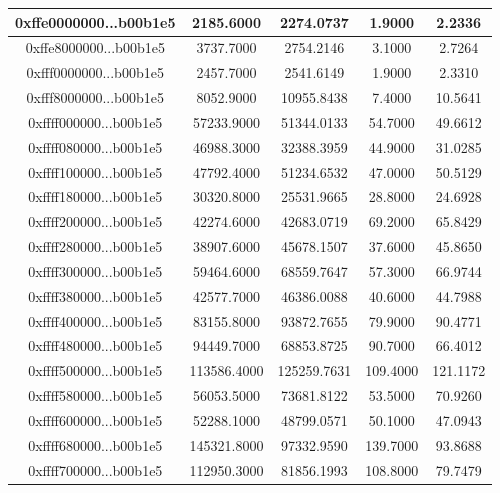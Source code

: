 \documentclass[12pt, a4paper]{article}
\begin{document}
\begin{table}[H]
\begin{tabular}{|c|c|c|c|c|}
0xffe0000000...b00b1e5 &     2185.6000 &     2274.0737 &         1.9000 &        2.2336 \\ \hline
0xffe8000000...b00b1e5 &     3737.7000 &     2754.2146 &         3.1000 &        2.7264 \\ \hline
0xfff0000000...b00b1e5 &     2457.7000 &     2541.6149 &         1.9000 &        2.3310 \\ \hline
0xfff8000000...b00b1e5 &     8052.9000 &    10955.8438 &         7.4000 &       10.5641 \\ \hline
0xffff000000...b00b1e5 &    57233.9000 &    51344.0133 &        54.7000 &       49.6612 \\ \hline
0xffff080000...b00b1e5 &    46988.3000 &    32388.3959 &        44.9000 &       31.0285 \\ \hline
0xffff100000...b00b1e5 &    47792.4000 &    51234.6532 &        47.0000 &       50.5129 \\ \hline
0xffff180000...b00b1e5 &    30320.8000 &    25531.9665 &        28.8000 &       24.6928 \\ \hline
0xffff200000...b00b1e5 &    42274.6000 &    42683.0719 &        69.2000 &       65.8429 \\ \hline
0xffff280000...b00b1e5 &    38907.6000 &    45678.1507 &        37.6000 &       45.8650 \\ \hline
0xffff300000...b00b1e5 &    59464.6000 &    68559.7647 &        57.3000 &       66.9744 \\ \hline
0xffff380000...b00b1e5 &    42577.7000 &    46386.0088 &        40.6000 &       44.7988 \\ \hline
0xffff400000...b00b1e5 &    83155.8000 &    93872.7655 &        79.9000 &       90.4771 \\ \hline
0xffff480000...b00b1e5 &    94449.7000 &    68853.8725 &        90.7000 &       66.4012 \\ \hline
0xffff500000...b00b1e5 &   113586.4000 &   125259.7631 &       109.4000 &      121.1172 \\ \hline
0xffff580000...b00b1e5 &    56053.5000 &    73681.8122 &        53.5000 &       70.9260 \\ \hline
0xffff600000...b00b1e5 &    52288.1000 &    48799.0571 &        50.1000 &       47.0943 \\ \hline
0xffff680000...b00b1e5 &   145321.8000 &    97332.9590 &       139.7000 &       93.8688 \\ \hline
0xffff700000...b00b1e5 &   112950.3000 &    81856.1993 &       108.8000 &       79.7479 \\ \hline

\end{tabular}
\end{table}
\end{document}
